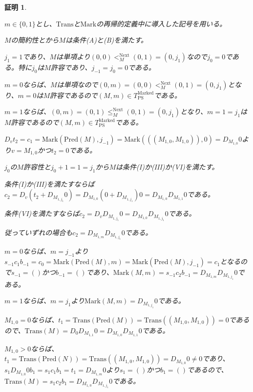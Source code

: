 \documentclass[dvipdfmx,uplatex]{jsarticle}
\theoremstyle{customnonumberbreakfortheorem}
\theoremstyle{customnonumberbreakforproof}
\newtheorem{hideableproof}{証明}
\begin{document}
\begin{hideableproof}
	\begin{indented}
		\item \(m \in \{0,1\}\)とし、\(\textrm{Trans}\)と\(\textrm{Mark}\)の再帰的定義中に導入した記号を用いる。
		\item \(M\)の簡約性とから\(M\)は条件(A)と(B)を満たす。
		\item \(j_1 = 1\)であり、\(M\)は単項より\((0,0) <_M^{\textrm{Next}} (0,1) = (0,j_1)\)なので\(j_0 = 0\)である。特に\(j_0\)は\(M\)許容であり、\(j_{-1} = j_0 = 0\)である。
		\item \(m=0\)ならば、\(M\)は単項なので\((0,m) = (0,0) <_M^{\textrm{Next}} (0,1) = (0,j_1)\)となり、\(m = 0\)は\(M\)許容であるので\((M,m) \in T_{\textrm{PS}}^{\textrm{Marked}}\)である。
		\item \(m=1\)ならば、\((0,m) = (0,1) \leq_M^{\textrm{Next}} (0,1) = (0,j_1)\)となり、\(m = 1 = j_1\)は\(M\)許容であるので\((M,m) \in T_{\textrm{PS}}^{\textrm{Marked}}\)である。
		\item \(D_v t_2 = c_1 = \textrm{Mark}(\textrm{Pred}(M),j_{-1}) = \textrm{Mark}(((M_{1,0},M_{1,0})),0) = D_{M_{1,0}} 0\)より\(v = M_{1,0}\)かつ\(t_2 = 0\)である。
		\item \(j_0\)の\(M\)許容性と\(j_0+1 = 1 = j_1\)から\(M\)は条件(I)か(III)か(VI)を満たす。
		\item 条件(I)か(III)を満たすならば\(c_2 = D_v(t_2 + D_{M_{1,j_1}} 0) = D_{M_{1,0}}(0 + D_{M_{1,j_1}}) 0 = D_{M_{1,0}} D_{M_{1,1}} 0\)である。
		\item 条件(VI)を満たすならば\(c_2 = D_v D_{M_{1,j_1}} 0 = D_{M_{1,0}} D_{M_{1,j_1}} 0\)である。
		\item 従っていずれの場合も\(c_2 = D_{M_{1,m}} D_{M_{1,j_1}} 0\)である。
		\item \(m=0\)ならば、\(m = j_{-1}\)より\(s_{-1} c_1 b_{-1} = c_0 = \textrm{Mark}(\textrm{Pred}(M),m) = \textrm{Mark}(\textrm{Pred}(M),j_{-1}) = c_1\)となるので\(s_{-1} = ()\)かつ\(b_{-1} = ()\)であり、\(\textrm{Mark}(M,m) = s_{-1} c_2 b_{-1} = D_{M_{1,m}} D_{M_{1,j_1}} 0\)である。
		\item \(m=1\)ならば、\(m = j_1\)より\(\textrm{Mark}(M,m) = D_{M_{1,j_1}} 0\)である。
		\begin{indented}
			\item \(M_{1,0} = 0\)ならば、\(t_1 = \textrm{Trans}(\textrm{Pred}(M)) = \textrm{Trans}((M_{1,0},M_{1,0})) = 0\)であるので、\(\textrm{Trans}(M) = D_0 D_{M_{1,1}} 0 = D_{M_{1,0}} D_{M_{1,1}} 0\)である。
			\item \(M_{1,0} > 0\)ならば、\(t_1 = \textrm{Trans}(\textrm{Pred}(N)) = \textrm{Trans}((M_{1,0},M_{1,0})) = D_{M_{1,0}} 0 \neq 0\)であり、\(s_1 D_{M_{1,0}} 0 b_1 = s_1 c_1 b_1 = t_1 = D_{M_{1,m}} 0\)より\(s_1 = ()\)かつ\(b_1 = ()\)であるので、\(\textrm{Trans}(M) = s_1 c_2 b_1 = D_{M_{1,0}} D_{M_{1,j_1}} 0\)である。
		\end{indented}
	\end{indented}
\end{hideableproof}
\end{document}
